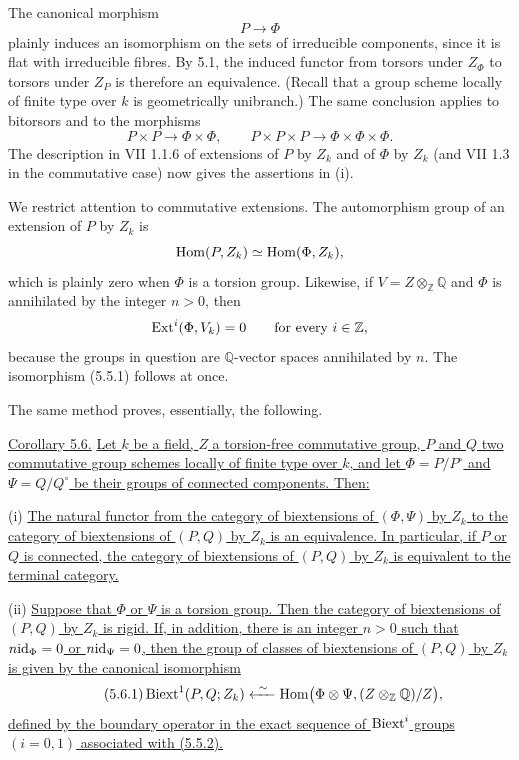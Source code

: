 The canonical morphism
\[
 P\longrightarrow\Phi
\]
plainly induces an isomorphism on the sets of irreducible components,
since it is flat with irreducible fibres.  By 5.1, the induced functor
from torsors under $Z_\Phi$ to torsors under $Z_P$ is therefore an
equivalence.  (Recall that a group scheme locally of finite type over
$k$ is geometrically unibranch.)  The same conclusion applies to
bitorsors and to the morphisms
\[
 P\times P\longrightarrow\Phi\times\Phi,
 \qquad
 P\times P\times P\longrightarrow\Phi\times\Phi\times\Phi.
\]
The description in VII 1.1.6 of extensions of $P$ by $Z_k$ and of
$\Phi$ by $Z_k$ (and VII 1.3 in the commutative case) now gives the
assertions in (i).

We restrict attention to commutative extensions.  The automorphism
group of an extension of $P$ by $Z_k$ is
\[
 \operatorname{Hom}(P,Z_k)\simeq\operatorname{Hom}(\Phi,Z_k),
\]
which is plainly zero when $\Phi$ is a torsion group.  Likewise, if
$V=Z\otimes_{\mathbb Z}\mathbb Q$ and $\Phi$ is annihilated by the
integer $n>0$, then
\[
 \operatorname{Ext}^i(\Phi,V_k)=0\qquad\text{for every }i\in\mathbb Z,
\]
because the groups in question are $\mathbb Q$-vector spaces
annihilated by $n$.  The isomorphism (5.5.1) follows at once.

The same method proves, essentially, the following.

\medskip
\noindent\underline{Corollary 5.6.}  \underline{Let $k$ be a field,
$Z$ a torsion-free commutative group, $P$ and $Q$ two commutative
group schemes locally of finite type over $k$, and let
$\Phi=P/P^\circ$ and $\Psi=Q/Q^\circ$ be their groups of connected
components.  Then:}

\smallskip
\noindent (i) \underline{The natural functor from the category of
biextensions of $(\Phi,\Psi)$ by $Z_k$ to the category of
biextensions of $(P,Q)$ by $Z_k$ is an equivalence.  In particular,
if $P$ or $Q$ is connected, the category of biextensions of $(P,Q)$
by $Z_k$ is equivalent to the terminal category.}

\smallskip
\noindent (ii) \underline{Suppose that $\Phi$ or $\Psi$ is a torsion
group.  Then the category of biextensions of $(P,Q)$ by $Z_k$ is
rigid.  If, in addition, there is an integer $n>0$ such that
$n\mathrm{id}_\Phi=0$ or $n\mathrm{id}_\Psi=0$, then the group of classes of
biextensions of $(P,Q)$ by $Z_k$ is given by the canonical
isomorphism}
\begin{equation}\tag{5.6.1}
 \operatorname{Biext}^1(P,Q;Z_k)
 \xleftarrow{\ \sim\ }
 \operatorname{Hom}\bigl(\Phi\otimes\Psi,(Z\otimes_{\mathbb Z}\mathbb Q)/Z\bigr),
\end{equation}
\underline{defined by the boundary operator in the exact sequence of
$\operatorname{Biext}^i$ groups $(i=0,1)$ associated with (5.5.2).}

